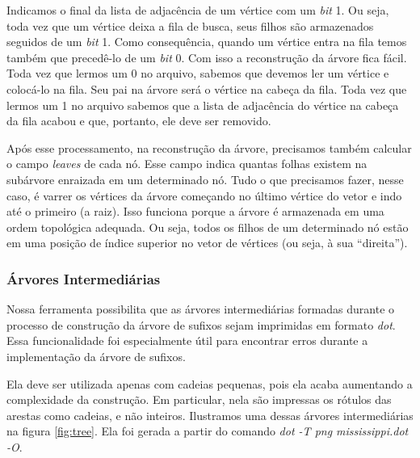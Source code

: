 \documentclass[]{article}
\newcommand{\figref}[1]{figura \ref{#1}}
\begin{document}
Indicamos o final da lista de adjacência de um vértice com um \textit{bit} 1. Ou seja, toda vez que um vértice deixa a fila de busca, seus filhos são armazenados seguidos de um \textit{bit} 1. Como consequência, quando um vértice entra na fila temos também que precedê-lo de um \textit{bit} 0. Com isso a reconstrução da árvore fica fácil. Toda vez que lermos um 0 no arquivo, sabemos que devemos ler um vértice e colocá-lo na fila. Seu pai na árvore será o vértice na cabeça da fila. Toda vez que lermos um 1 no arquivo sabemos que a lista de adjacência do vértice na cabeça da fila acabou e que, portanto, ele deve ser removido. 

Após esse processamento, na reconstrução da árvore, precisamos também calcular o campo \textit{leaves} de cada nó. Esse campo indica quantas folhas existem na subárvore enraizada em um determinado nó. Tudo o que precisamos fazer, nesse caso, é varrer os vértices da árvore começando no último vértice do vetor e indo até o primeiro (a raiz). Isso funciona porque a árvore é armazenada em uma ordem topológica adequada. Ou seja, todos os filhos de um determinado nó estão em uma posição de índice superior no vetor de vértices (ou seja, à sua ``direita'').

\subsubsection{Árvores Intermediárias}

Nossa ferramenta possibilita que as árvores intermediárias formadas durante o processo de construção da árvore de sufixos sejam imprimidas em formato \textit{dot}. Essa funcionalidade foi especialmente útil para encontrar erros durante a implementação da árvore de sufixos.

Ela deve ser utilizada apenas com cadeias pequenas, pois ela acaba aumentando a complexidade da construção. Em particular, nela são impressas os rótulos das arestas como cadeias, e não inteiros. Ilustramos uma dessas árvores intermediárias na \figref{fig:tree}. Ela foi gerada a partir do comando \textit{dot -T png mississippi.dot -O}.
\end{document}
